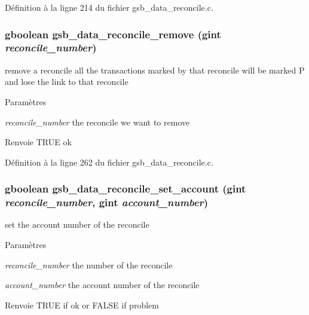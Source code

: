 Définition à la ligne 214 du fichier gsb\_\-data\_\-reconcile.c.

\subsubsection[{gsb\_\-data\_\-reconcile\_\-remove}]{\setlength{\rightskip}{0pt plus 5cm}gboolean gsb\_\-data\_\-reconcile\_\-remove (gint {\em reconcile\_\-number})}\label{gsb__data__reconcile_8h_aab7d2ded64eec85188ff49c86165b53d}
remove a reconcile all the transactions marked by that reconcile will be marked P and lose the link to that reconcile


\begin{DoxyParams}{Paramètres}
\item[{\em reconcile\_\-number}]the reconcile we want to remove\end{DoxyParams}
\begin{DoxyReturn}{Renvoie}
TRUE ok 
\end{DoxyReturn}


Définition à la ligne 262 du fichier gsb\_\-data\_\-reconcile.c.

\subsubsection[{gsb\_\-data\_\-reconcile\_\-set\_\-account}]{\setlength{\rightskip}{0pt plus 5cm}gboolean gsb\_\-data\_\-reconcile\_\-set\_\-account (gint {\em reconcile\_\-number}, \/  gint {\em account\_\-number})}\label{gsb__data__reconcile_8h_a0c9177f5d2c4a6d4746ace048acb1f81}
set the account number of the reconcile


\begin{DoxyParams}{Paramètres}
\item[{\em reconcile\_\-number}]the number of the reconcile \item[{\em account\_\-number}]the account number of the reconcile\end{DoxyParams}
\begin{DoxyReturn}{Renvoie}
TRUE if ok or FALSE if problem 
\end{DoxyReturn}


